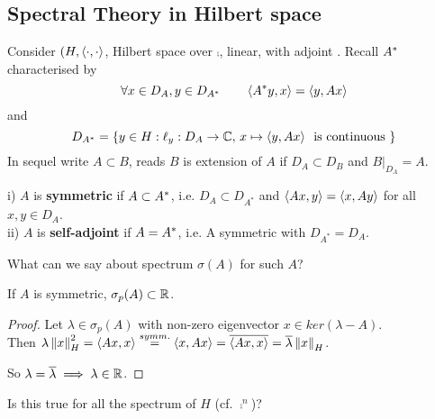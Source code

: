 \documentclass{article}
\begin{document}
\subsection{Spectral Theory in Hilbert space}
Consider $(H,\left<{\cdot},{\cdot}\right>$, Hilbert space over $\comp$,  linear, with adjoint .
Recall ${A}^*$ characterised by $$\forall x\in D_A, y\in D_{A^*} \qquad \left<{{A}^*y},{x}\right>=\left<{y},{Ax}\right>$$ 
and 
$$D_{A^*}=\{y\in H : \ell_y:D_A\to \mathbb{C},\,x\mapsto \left<{y},{Ax}\right>\,\text{ is continuous }\}$$
In sequel write $A\subset B$, reads $B$ is extension of $A$ if $D_A\subset D_B$ and $B|_{D_A}=A$.


\begin{definition}\nl
	i)  $A$ is {\textbf{symmetric}} if $A\subset {A}^*$, i.e. $D_A\subset D_{A^*}$ and $\left<{Ax},{y}\right>=\left<{x},{Ay}\right>$ for all $x,y\in D_A$.\\
	ii) $A$ is {\textbf{self-adjoint}} if $A={A}^*$, i.e. A symmetric with $D_{A^*}=D_A$.
\end{definition}

What can we say about spectrum $\sigma(A)$ for such $A$?

\begin{lemma}
	If $A$ is symmetric, $\sigma_p(A)\subset\mathbb{R}$.

\end{lemma}
	\begin{proof}
		Let $\lambda\in\sigma_p(A)$ with non-zero eigenvector $x\in ker(\lambda-A)$. \\
		Then $\lambda\left\|{x}\right\|_H^2=\left<{Ax},{x}\right>\stackrel{symm.}{=}\left<{x},{Ax}\right>=\overline{\left<{Ax},{x}\right>}=\overline{\lambda}\left\|{x}\right\|_H$.   
  
  So $\lambda=\overline{\lambda}\implies \lambda\in\mathbb{R}$.
	\end{proof}
Is this true for all the spectrum of $  H$ (cf. $\comp^n$)?

\end{document}
